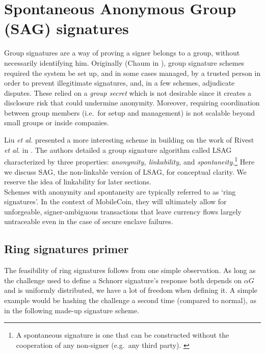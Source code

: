 \section{Spontaneous Anonymous Group (SAG) signatures}
\label{SAG_section}

Group signatures are a way of proving a signer belongs to a group, without necessarily identifying him. Originally (Chaum in \cite{Chaum:1991:GS:1754868.1754897}), group signature schemes required the system be set up, and in some cases managed, by a trusted person in order to prevent illegitimate signatures, and, in a few schemes, adjudicate disputes. These relied on a {\em group secret} which is not desirable since it creates a disclosure risk that could undermine anonymity. Moreover, requiring coordination between group members (i.e.\ for setup and management) is not scalable beyond small groups or inside companies.

Liu {\em et al.} presented a more interesting scheme in \cite{Liu2004} building on the work of Rivest {\em et al.} in \cite{rivest-leak-secret}. The authors detailed a group signature algorithm called LSAG characterized by three properties: {\em anonymity, linkability,} and {\em spontaneity}.\footnote{A spontaneous signature is one that can be constructed without the cooperation of any non-signer (e.g.\ any third party). \cite{Liu2004}} Here we discuss SAG, the non-linkable version of LSAG, for conceptual clarity. We reserve the idea of linkability for later sections.
\\

Schemes with anonymity and spontaneity are typically referred to as `ring signatures'. In the context of MobileCoin, they will ultimately allow for unforgeable, signer-ambiguous transactions that leave currency flows largely untraceable even in the case of secure enclave failures.


\subsection*{Ring signatures primer}

The feasibility of ring signatures follows from one simple observation. As long as the challenge used to define a Schnorr signature's response both depends on $\alpha G$ and is uniformly distributed, we have a lot of freedom when defining it. A simple example would be hashing the challenge a second time (compared to normal), as in the following made-up signature scheme.

